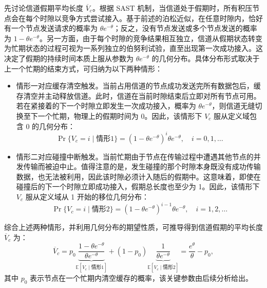 先讨论信道假期平均长度 $\overline{V}_c$。根据 SAST 机制，当信道处于假期时，所有积压节点会在每个时隙以竞争方式尝试接入。基于前述的泊松近似，在任意时隙内，恰好有一个节点发送请求的概率为 $\theta e^{-\theta}$；反之，没有节点发送或多个节点发送的概率为 $1 - \theta e^{-\theta}$。另一方面，由于每个时隙的竞争结果相互独立，信道从假期状态转变为忙期状态的过程可视为一系列独立的伯努利试验，直至出现第一次成功接入。这决定了假期的持续时间本质上服从参数为 $\theta e^{-\theta}$ 的几何分布。具体分布形式取决于上一个忙期的结束方式，可归纳为以下两种情形：
\begin{itemize}
	\item 情形一对应缓存清空触发。当前占用信道的节点成功发送完所有数据包后，缓存清空并主动释放信道。此时，信道在当前时隙结束后立即对所有节点可用。若在紧接着的下一个时隙立即发生一次成功接入，概率为 $\theta e^{-\theta}$，则信道无缝切换至下一个忙期，物理上的假期时间为 0。因此，该情形下 $V_c$ 服从定义域包含 0 的几何分布：
	\begin{equation}
		\Pr \{ V_c = i \mid \text{情形1} \} = (1 - \theta e^{-\theta})^i \theta e^{-\theta}, \quad i = 0, 1, \ldots
	\end{equation}
	
	\item 情形二对应碰撞中断触发。当前忙期由于节点在传输过程中遭遇其他节点的并发传输而被迫中止。值得注意的是，发生碰撞的那个时隙本身既没有成功传输数据，也无法被利用，因此该时隙必须计入随后的假期中。这意味着，即使在碰撞后的下一个时隙立即成功接入，假期总长度也至少为 1。因此，该情形下 $V_c$ 服从定义域从 1 开始的移位几何分布：
	\begin{equation}
		\Pr \{ V_c = i \mid \text{情形2} \} = (1 - \theta e^{-\theta})^{i-1} \theta e^{-\theta}, \quad i = 1, 2, \ldots
	\end{equation}

\end{itemize}
综合上述两种情形，并利用几何分布的期望性质，可推导得到信道假期的平均长度 $\overline{V}_c$ 为：
\begin{equation}
	\label{eq:mean_vc_derived}
	\overline{V}_c = p_0 \underbrace{\frac{1 - \theta e^{-\theta}}{\theta e^{-\theta}}}_{\mathbb{E}[V_c \mid \text{情形1}]} + (1 - p_0) \underbrace{\frac{1}{\theta e^{-\theta}}}_{\mathbb{E}[V_c \mid \text{情形2}]} = \frac{e^{\theta}}{\theta} - p_0,
\end{equation}
其中 $p_0$ 表示节点在一个忙期内清空缓存的概率，该关键参数由后续分析给出。


